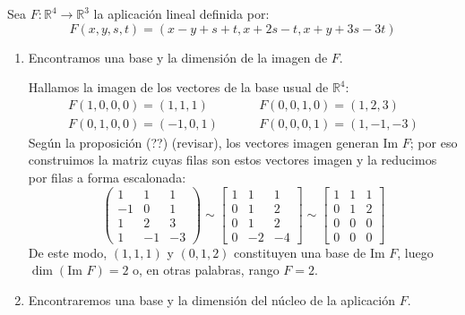 Sea \(F:\mathbb{R}^4 \rightarrow \mathbb{R}^3\) la aplicación lineal definida por:
\[
  F(x,y,s,t) = (x-y+s+t,x+2s-t,x+y+3s-3t)
\]
\begin{enumerate}[label=\alph*.]
  \item Encontramos una base y la dimensión de la imagen de \(F\).
  
  Hallamos la imagen de los vectores de la base usual de \(\mathbb{R}^4\):
  \begin{align*}
    F(1,0,0,0) = (1,1,1)\phantom{-} &\qquad F(0,0,1,0) = (1,2,3)\\
    F(0,1,0,0) = (-1,0,1) &\qquad F(0,0,0,1) = (1,-1,-3)
  \end{align*}
  Según la proposición (??) (revisar), los vectores imagen generan \(\text{Im } F\); por eso construimos la matriz cuyas filas son estos vectores imagen y la reducimos por filas a forma escalonada:
  \[
  \begin{pmatrix}
    1 & 1 & 1 \\
    -1 & 0 & 1 \\
    1 & 2 & 3 \\
    1 & -1 & -3
  \end{pmatrix} \sim \begin{bmatrix}
    1 & 1 & 1 \\
    0 & 1 & 2 \\
    0 & 1 & 2 \\
    0 & -2 & -4
  \end{bmatrix} \sim \begin{bmatrix}
    1 & 1 & 1 \\
    0 & 1 & 2 \\
    0 & 0 & 0 \\
    0 & 0 & 0
  \end{bmatrix}
  \]
  De este modo, \((1,1,1)\) y \((0,1,2)\) constituyen una base de \(\text{Im } F\), luego \(\dim(\text{Im } F) = 2\) o, en otras palabras, rango \(F=2\).
  \item Encontraremos una base y la dimensión del núcleo de la aplicación \(F\).


\end{enumerate}
